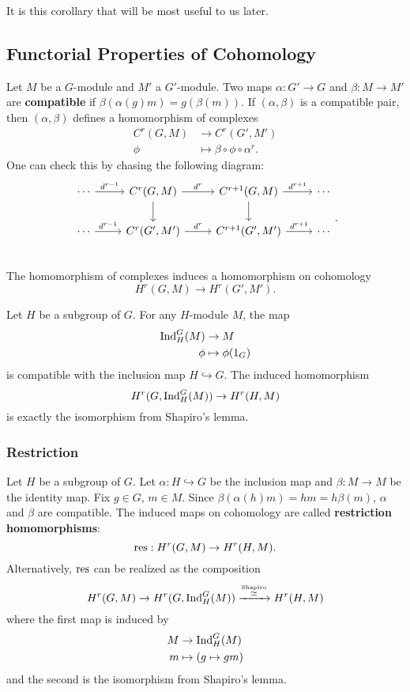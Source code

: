 It is this corollary that will be most useful to us later.

\subsection{Functorial Properties of Cohomology}
Let $M$ be a $G$-module and $M'$ a $G'$-module. Two maps $\alpha:G'\to G$ and $\beta:M\to M'$ are \textbf{compatible} if $\beta(\alpha(g)m)=g(\beta(m))$. If $(\alpha,\beta)$ is a compatible pair, then $(\alpha,\beta)$ defines a homomorphism of complexes
\begin{align*}
	C^{r}(G,M)&\to C^{r}(G',M')\\
	\phi&\mapsto\beta\circ\phi\circ\alpha^{r}
.\end{align*}
One can check this by chasing the following diagram:
\[
\begin{tikzcd}
	\cdots\ar{r}{d^{r-1}} & C^{r}(G,M)\ar{r}{d^{r}}\ar[d] & C^{r+1}(G,M)\ar{r}{d^{r+1}}\ar[d] & \cdots\\
	\cdots\ar{r}{d^{r-1}} & C^{r}(G',M')\ar{r}{d^{r}} & C^{r+1}(G',M')\ar{r}{d^{r+1}} & \cdots\\
\end{tikzcd}
.\]
The homomorphism of complexes induces a homomorphism on cohomology
\[
	H^{r}(G,M)\to H^{r}(G',M')
.\]
\begin{example}
Let $H$ be a subgroup of $G$. For any $H$-module $M$, the map
\begin{align*}
	\operatorname{Ind}^{G}_H(M)&\to M\\
	\phi&\mapsto \phi(1_G)
\end{align*}
is compatible with the inclusion map $H\hookrightarrow G$. The induced homomorphism
\[
	H^{r}(G,\operatorname{Ind}^{G}_H(M))\to H^{r}(H,M)
\] 
is exactly the isomorphism from Shapiro's lemma.
\end{example}

\subsubsection{Restriction} 

Let $H$ be a subgroup of $G$. Let $\alpha:H\hookrightarrow G$ be the inclusion map and $\beta:M\to M$ be the identity map. Fix $g\in G$, $m\in M$. Since $\beta(\alpha(h)m)=hm=h\beta(m)$, $\alpha$ and $\beta$ are compatible. The induced maps on cohomology are called \textbf{restriction homomorphisms}:
\[
	\operatorname{res}:H^{r}(G,M)\to H^{r}(H,M)
.\] 
Alternatively, $\operatorname{res}$ can be realized as the composition
\[
	H^{r}(G,M)\to H^{r}(G,\operatorname{Ind}^{G}_H(M))\xrightarrow{\overset{\text{Shapiro}}{\simeq}} H^{r}(H,M)
\] 
where the first map is induced by  
\begin{align*}
	M&\to\operatorname{Ind}^{G}_H(M)\\
	m&\mapsto (g\mapsto gm)
\end{align*}
and the second is the isomorphism from Shapiro's lemma.
